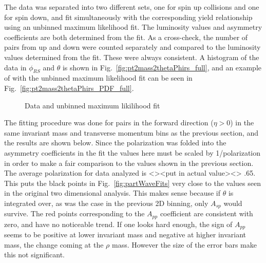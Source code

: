 \documentclass[letterpaper, abstract = on,listof=totoc, bibliography=totoc]{scrreprt}
\newcommand{\phirs}{\phi_{RS}}
\begin{document}
The data was separated into two different sets, one for spin up collisions and one for spin down, and fit simultaneously with the corresponding yield relationship using an unbinned maximum likelihood fit. The luminosity values and asymmetry coefficients are both determined from the fit. As a cross-check, the number of pairs from up and down were counted separately and compared to the luminosity values determined from the fit. These were always consistent. A histogram of the data in $\phirs$ and $\theta$ is shown in Fig.~\ref{fig:pt2mass2thetaPhirs_full}, and an example of with the unbinned maximum likelihood fit can be seen in Fig.~\ref{fig:pt2mass2thetaPhirs_PDF_full}.
\begin{figure}[!tbp]
  \centering
  \hfill
  \caption{Data and unbinned maximum likilihood fit}
\end{figure}

The fitting procedure was done for pairs in the forward direction ($\eta > 0$) in the same invariant mass and transverse momentum bins as the previous section, and the results are shown below. Since the polarization was folded into the asymmetry coefficients in the fit the values here must be scaled by 1/polarization in order to make a fair comparison to the values shown in the previous section. The average polarization for data analyzed is <><put in actual value><> .65. This puts the black points in Fig.~\ref{fig:partWaveFits} very close to the values seen in the original two dimensional analysis. This makes sense because if $\theta$ is integrated over, as was the case in the previous 2D binning, only $A_{sp}$ would survive. The red points corresponding to the $A_{pp}$ coefficient are consistent with zero, and have no noticeable trend. If one looks hard enough, the sign of $A_{pp}$ seems to be positive at lower invariant mass and negative at higher invariant mass, the change coming at the $\rho$ mass. However the size of the error bars make this not significant. 
\end{document}
